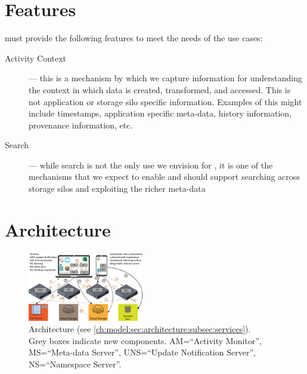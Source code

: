 
\section{Features}
\label{ch:model:sec:features}

\system must provide the following features to meet the needs of the use cases:

\begin{description}
    \item[Activity Context] --- this is a mechanism by which we capture
        information for understanding the context in which data is created,
        transformed, and accessed.  This is not application or storage silo specific
        information. Examples of this might include timestamps, application specific
        meta-data, history information, provenance information, etc.

    \item[Search] --- while search is not the only use we envision for \system,
        it is one of the mechanisms that we expect to enable and should support
        searching across storage silos and exploiting the richer meta-data
\end{description}

\section{Architecture}
\label{ch:model:sec:architecture}


\begin{figure}[!tb]
    \centering
    \includegraphics[width=0.45\textwidth]{reference/hotstorage21/figures/Naming5-legend.png}
    \caption{\emph{\system} Architecture (see \autoref{ch:model:sec:architecture:subsec:services}).\\%
        Grey boxes indicate new components. AM=``Activity Monitor'', MS=``Meta-data Server'', UNS=``Update Notification Server'', NS=``Namespace Server''.
    }
    \label{ch:model:fig:arch}
\end{figure}

